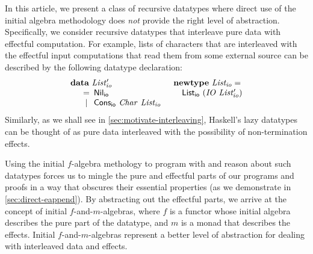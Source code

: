 \documentclass{jfp1}
\newcommand{\kw}[1]{\textbf{#1}}
\begin{document}
In this article, we present a class of recursive datatypes where direct
use of the initial algebra methodology does \emph{not} provide the
right level of abstraction. Specifically, we consider recursive
datatypes that interleave pure data with effectful computation. For
example, lists of characters that are interleaved with the effectful
input computations that read them from some external source can be
described by the following datatype declaration:
\begin{displaymath}\label{defn:listio}
  \begin{array}{ll}
    \kw{data}~\mathit{List'_{io}}
    &
    \kw{newtype}~\mathit{List_{io}} = 
    \\
    \quad
    \begin{array}[t]{c@{\hspace{0.5em}}l}
      = & \mathsf{Nil_{io}} \\
      | & \mathsf{Cons_{io}}~\mathit{Char}~\mathit{List_{io}} \\
    \end{array}
    &
    \quad \mathsf{List_{io}}~(\mathit{IO}~\mathit{List'_{io}})
  \end{array}
\end{displaymath}
Similarly, as we shall see in \autoref{sec:motivate-interleaving},
Haskell's lazy datatypes can be thought of as pure data interleaved
with the possibility of non-termination effects.

Using the initial $f$-algebra methology to program with and reason
about such datatypes forces us to mingle the pure and effectful parts
of our programs and proofs in a way that obscures their essential
properties (as we demonstrate in \autoref{sec:direct-eappend}). By
abstracting out the effectful parts, we arrive at the concept of
initial $f$-and-$m$-algebras, where $f$ is a functor whose initial
algebra describes the pure part of the datatype, and $m$ is a
monad that describes the effects. Initial $f$-and-$m$-algebras
represent a better level of abstraction for dealing with interleaved
data and effects.
\end{document}

